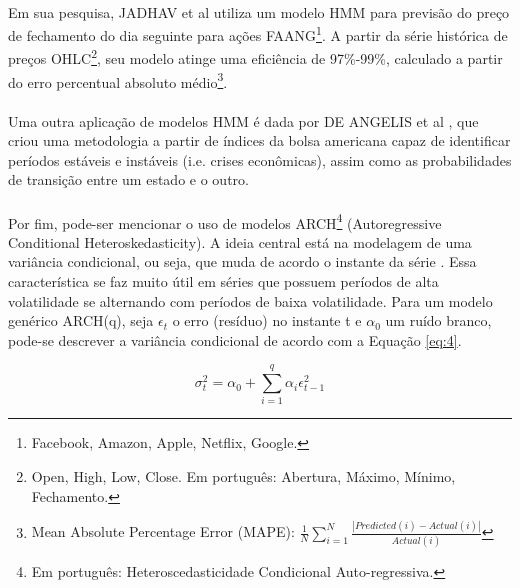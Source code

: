 \paragraph{} Em sua pesquisa, JADHAV et al \cite{jadhav2021forecasting} utiliza um modelo HMM para previsão do preço de fechamento do dia seguinte para ações FAANG\footnote{Facebook, Amazon, Apple, Netflix, Google.}. A partir da série histórica de preços OHLC\footnote{Open, High, Low, Close. Em português: Abertura, Máximo, Mínimo, Fechamento.}, seu modelo atinge uma eficiência de 97\%-99\%, calculado a partir do erro percentual absoluto médio\footnote{Mean Absolute Percentage Error (MAPE): \begin{math} \frac{1}{N}\sum_{i=1}^{N} \frac{|Predicted(i)-Actual(i)|}{Actual(i)} \end{math}}.

\paragraph{} Uma outra aplicação de modelos HMM é dada por DE ANGELIS et al \cite{de2013dynamic}, que criou uma metodologia a partir de índices da bolsa americana capaz de identificar períodos estáveis e instáveis (i.e. crises econômicas), assim como as probabilidades de transição entre um estado e o outro.

\paragraph{} Por fim, pode-ser mencionar o uso de modelos ARCH\footnote{Em português: Heteroscedasticidade Condicional Auto-regressiva.} (Autoregressive Conditional Heteroskedasticity). A ideia central está na modelagem de uma variância condicional, ou seja, que muda de acordo o instante da série \cite{enders2008applied}. Essa característica se faz muito útil em séries que possuem períodos de alta volatilidade se alternando com períodos de baixa volatilidade. Para um modelo genérico ARCH(q), seja \begin{math}\epsilon_t\end{math} o erro (resíduo) no instante t e \begin{math}\alpha_0\end{math} um ruído branco, pode-se descrever a variância condicional de acordo com a Equação \ref{eq:4}.

\begin{equation} \label{eq:4}
\sigma_t^2 = \alpha_0 + \sum_{i=1}^{q} \alpha_i\epsilon_{t-1}^{2}
\end{equation}

